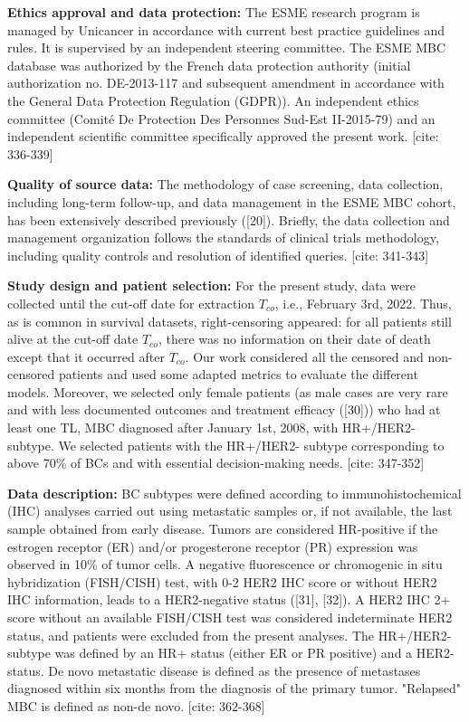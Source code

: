 \documentclass[a4paper,10pt]{article}
\begin{document}
\textbf{Ethics approval and data protection:} The ESME research program is managed by Unicancer in accordance with current best practice guidelines and rules. It is supervised by an independent steering committee. The ESME MBC database was authorized by the French data protection authority (initial authorization no. DE-2013-117 and subsequent amendment in accordance with the General Data Protection Regulation (GDPR)). An independent ethics committee (Comité De Protection Des Personnes Sud-Est II-2015-79) and an independent scientific committee specifically approved the present work. [cite: 336-339]

\textbf{Quality of source data:} The methodology of case screening, data collection, including long-term follow-up, and data management in the ESME MBC cohort, has been extensively described previously ([20]). Briefly, the data collection and management organization follows the standards of clinical trials methodology, including quality controls and resolution of identified queries. [cite: 341-343]

\textbf{Study design and patient selection:} For the present study, data were collected until the cut-off date for extraction $T_{co}$, i.e., February 3rd, 2022. Thus, as is common in survival datasets, right-censoring appeared: for all patients still alive at the cut-off date $T_{co}$, there was no information on their date of death except that it occurred after $T_{co}$. Our work considered all the censored and non-censored patients and used some adapted metrics to evaluate the different models. Moreover, we selected only female patients (as male cases are very rare and with less documented outcomes and treatment efficacy ([30])) who had at least one TL, MBC diagnosed after January 1st, 2008, with HR+/HER2- subtype. We selected patients with the HR+/HER2- subtype corresponding to above 70\% of BCs and with essential decision-making needs. [cite: 347-352]

\textbf{Data description:} BC subtypes were defined according to immunohistochemical (IHC) analyses carried out using metastatic samples or, if not available, the last sample obtained from early disease. Tumors are considered HR-positive if the estrogen receptor (ER) and/or progesterone receptor (PR) expression was observed in 10\% of tumor cells. A negative fluorescence or chromogenic in situ hybridization (FISH/CISH) test, with 0-2 HER2 IHC score or without HER2 IHC information, leads to a HER2-negative status ([31], [32]). A HER2 IHC 2+ score without an available FISH/CISH test was considered indeterminate HER2 status, and patients were excluded from the present analyses. The HR+/HER2- subtype was defined by an HR+ status (either ER or PR positive) and a HER2- status. De novo metastatic disease is defined as the presence of metastases diagnosed within six months from the diagnosis of the primary tumor. "Relapsed" MBC is defined as non-de novo. [cite: 362-368]
\end{document}
